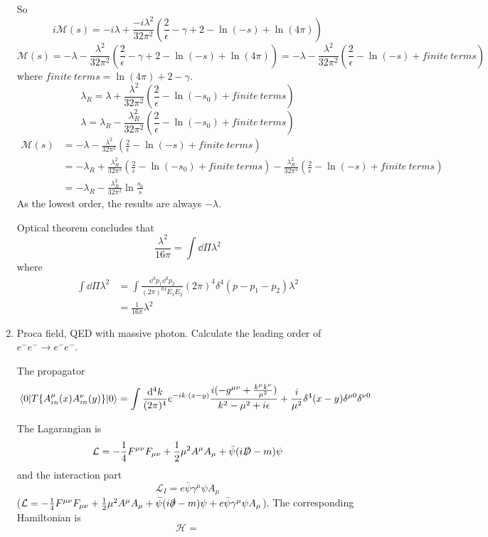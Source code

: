 \documentclass{article}
\newcommand{\gm}{\gamma^{\mu}}
\newcommand{\g}{\gamma}
\newcommand{\la}{\lambda}
\newcommand{\lag}{\mathcal{L}}
\begin{document}
\begin{enumerate}[\bf 1.]
So
$$i\mathcal{M}(s)=-i\la+\frac{-i\la^2}{32\pi^2}(\frac{2}{\epsilon}-\g+2-\ln(-s)+\ln(4\pi))$$
$$\mathcal{M}(s)=-\la-\frac{\la^2}{32\pi^2}(\frac{2}{\epsilon}-\g+2-\ln(-s)+\ln(4\pi))=-\la-\frac{\la^2}{32\pi^2}(\frac{2}{\epsilon}-\ln(-s)+finite\ terms)$$
where $finite\ terms=\ln(4\pi)+2-\g$.
$$\la_R=\la+\frac{\la^2}{32\pi^2}(\frac{2}{\epsilon}-\ln(-s_0)+finite\ terms)$$
$$\la=\la_R-\frac{\la_R^2}{32\pi^2}(\frac{2}{\epsilon}-\ln(-s_0)+finite\ terms)$$
\begin{align*}
  \mathcal{M}(s)&=-\la-\frac{\lambda^2}{32\pi^2}(\frac{2}{\epsilon}-\ln{(-s)}+finite\ terms)\\
  &=-\la_R+\frac{\la_R^2}{32\pi^2}(\frac{2}{\epsilon}-\ln{(-s_0)}+finite\ terms)-\frac{\lambda_R^2}{32\pi^2}(\frac{2}{\epsilon}-\ln{(-s)}+finite\ terms)\\
  &=-\la_R-\frac{\la_R^2}{32\pi^2}\ln{\frac{s_0}{s}}
\end{align*}
As the lowest order, the results are always $-\la$.

Optical theorem concludes that 
$$\frac{\la^2}{16\pi}=\int\dd\Pi\la^2$$
where
\begin{align*}
  \int\dd\Pi\la^2&=\int\frac{\dd^3p_1\dd^3p_2}{(2\pi)^64E_1E_2}(2\pi)^4\delta^4(p-p_1-p_2)\la^2\\
  &=\frac{1}{16\pi}\la^2
\end{align*}

  \item Proca field, QED with massive photon. Calculate the leading order of $e^-e^-\rightarrow e^-e^-$.

	The propagator
	$$\mel{0}{T\{A_{in}^{\mu}(x)A_{in}^{\nu}(y)\}}{0}=\int\frac{\dd^4k}{(2\pi)^4}e^{-ik\cdot (x-y)}\frac{i(-g^{\mu\nu}+\frac{k^{\mu}k^{\nu}}{\mu^2})}{k^2-\mu^2+i\epsilon}+\frac{i}{\mu^2}\delta^4(x-y)\delta^{\mu0}\delta^{\nu0}$$

The Lagarangian is 
$$\lag=-\frac{1}{4}F^{\mu\nu}F_{\mu\nu}+\frac{1}{2}\mu^2A^{\mu}A_{\mu}+\bar\psi(i\slashed D-m)\psi$$
and the interaction part
$$\lag_I=e\bar\psi\gm\psi A_{\mu}$$
($\lag=-\frac{1}{4}F^{\mu\nu}F_{\mu\nu}+\frac{1}{2}\mu^2A^{\mu}A_{\mu}+\bar\psi(i\slashed \partial-m)\psi+e\bar\psi\gm\psi A_{\mu}$). The corresponding Hamiltonian is 
$$\mathcal{H}=$$















\end{enumerate}
\end{document}
